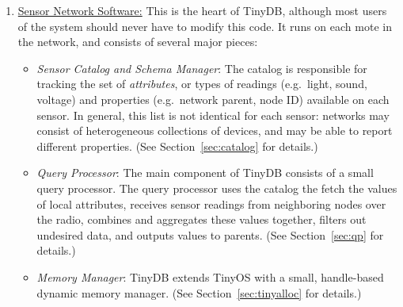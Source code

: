 \documentclass[11pt]{article}
\begin{document}
\begin{enumerate}
\item \underline{Sensor Network Software:}  This is the heart of TinyDB, although most users of
the system should never have to modify this code.  It runs on each
mote in the network, and consists of several major pieces:
\begin{itemize}
\item {\it Sensor Catalog and Schema Manager}:  The catalog is responsible for tracking the
set of {\it attributes}, or types of readings
(e.g.\ light, sound, voltage) and
properties (e.g.\ network parent, node ID) available
on each sensor.  In general, this list is not identical for each sensor:  networks may consist
of heterogeneous collections of devices, and may be able to report
different properties.  (See
Section~\ref{sec:catalog} for details.)

\item {\it Query Processor}:  The main component of TinyDB consists of a small query processor.  
The query processor uses the catalog the fetch the values of local attributes, receives sensor
readings from neighboring nodes over the radio, combines and aggregates these values together,
filters out undesired data, and outputs values to
parents.  (See Section~\ref{sec:qp} for details.)

\item {\it Memory Manager}:  TinyDB extends TinyOS with a small, handle-based
  dynamic memory manager.  (See Section~\ref{sec:tinyalloc} for details.)


\end{itemize}
\end{enumerate}
\end{document}
